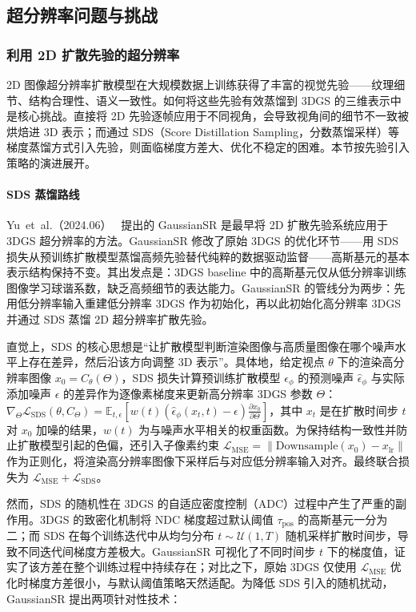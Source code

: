 \subsection{超分辨率问题与挑战}

\subsubsection{利用 2D 扩散先验的超分辨率}

2D 图像超分辨率扩散模型在大规模数据上训练获得了丰富的视觉先验——纹理细节、结构合理性、语义一致性。如何将这些先验有效蒸馏到 3DGS 的三维表示中是核心挑战。直接将 2D 先验逐帧应用于不同视角，会导致视角间的细节不一致被烘焙进 3D 表示；而通过 SDS（Score Distillation Sampling，分数蒸馏采样）等梯度蒸馏方式引入先验，则面临梯度方差大、优化不稳定的困难。本节按先验引入策略的演进展开。

\paragraph{SDS 蒸馏路线}

Yu~et~al.（2024.06）~\cite{2406_10111} 提出的 GaussianSR 是最早将 2D 扩散先验系统应用于 3DGS 超分辨率的方法。GaussianSR 修改了原始 3DGS 的优化环节——用 SDS 损失从预训练扩散模型蒸馏高频先验替代纯粹的数据驱动监督——高斯基元的基本表示结构保持不变。其出发点是：3DGS baseline 中的高斯基元仅从低分辨率训练图像学习球谐系数，缺乏高频细节的表达能力。GaussianSR 的管线分为两步：先用低分辨率输入重建低分辨率 3DGS 作为初始化，再以此初始化高分辨率 3DGS 并通过 SDS 蒸馏 2D 超分辨率扩散先验。

直觉上，SDS 的核心思想是“让扩散模型判断渲染图像与高质量图像在哪个噪声水平上存在差异，然后沿该方向调整 3D 表示”。具体地，给定视点 $\theta$ 下的渲染高分辨率图像 $x_0 = C_\theta(\Theta)$，SDS 损失计算预训练扩散模型 $\epsilon_\phi$ 的预测噪声 $\hat{\epsilon}_\phi$ 与实际添加噪声 $\epsilon$ 的差异作为逐像素梯度来更新高分辨率 3DGS 参数 $\Theta$：$\nabla_\Theta \mathcal{L}_{\text{SDS}}(\theta, C_\Theta) = \mathbb{E}_{t,\epsilon}[w(t)(\hat{\epsilon}_\phi(x_t, t) - \epsilon)\frac{\partial x_0}{\partial \Theta}]$，其中 $x_t$ 是在扩散时间步 $t$ 对 $x_0$ 加噪的结果，$w(t)$ 为与噪声水平相关的权重函数。为保持结构一致性并防止扩散模型引起的色偏，还引入子像素约束 $\mathcal{L}_{\text{MSE}} = \|\text{Downsample}(x_0) - x_{\text{lr}}\|$ 作为正则化，将渲染高分辨率图像下采样后与对应低分辨率输入对齐。最终联合损失为 $\mathcal{L}_{\text{MSE}} + \mathcal{L}_{\text{SDS}}$。

然而，SDS 的随机性在 3DGS 的自适应密度控制（ADC）过程中产生了严重的副作用。3DGS 的致密化机制将 NDC 梯度超过默认阈值 $\tau_{\text{pos}}$ 的高斯基元一分为二；而 SDS 在每个训练迭代中从均匀分布 $t \sim \mathcal{U}(1,T)$ 随机采样扩散时间步，导致不同迭代间梯度方差极大。GaussianSR 可视化了不同时间步 $t$ 下的梯度值，证实了该方差在整个训练过程中持续存在；对比之下，原始 3DGS 仅使用 $\mathcal{L}_{\text{MSE}}$ 优化时梯度方差很小，与默认阈值策略天然适配。为降低 SDS 引入的随机扰动，GaussianSR 提出两项针对性技术：

